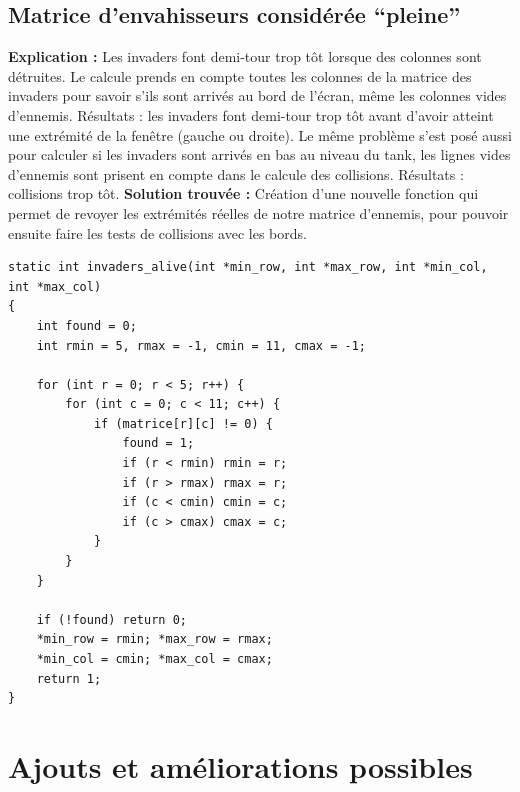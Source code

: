 \documentclass[12pt,a4paper]{report}
\begin{document}
\section{Matrice d'envahisseurs considérée “pleine”}
\textbf{Explication :} Les invaders font demi-tour trop tôt lorsque des colonnes sont détruites. Le calcule prends en compte toutes les colonnes de la matrice des invaders pour savoir s'ils sont arrivés au bord de l'écran, même les colonnes vides d'ennemis. Résultats :  les invaders font demi-tour trop tôt avant d'avoir atteint une extrémité de la fenêtre (gauche ou droite). 
Le même problème s'est posé aussi pour calculer si les invaders sont arrivés en bas au niveau du tank, les lignes vides d'ennemis sont prisent en compte dans le calcule des collisions. Résultats : collisions trop tôt. 
\newline 
\indent \textbf{Solution trouvée :} Création d'une nouvelle fonction qui permet de revoyer les extrémités réelles de notre matrice d'ennemis, pour pouvoir ensuite faire les tests de collisions avec les bords.
\vspace{0.5cm}
\begin{lstlisting}
static int invaders_alive(int *min_row, int *max_row, int *min_col, int *max_col)
{
    int found = 0;
    int rmin = 5, rmax = -1, cmin = 11, cmax = -1;

    for (int r = 0; r < 5; r++) {
        for (int c = 0; c < 11; c++) {
            if (matrice[r][c] != 0) {
                found = 1;
                if (r < rmin) rmin = r;
                if (r > rmax) rmax = r;
                if (c < cmin) cmin = c;
                if (c > cmax) cmax = c;
            }
        }
    }

    if (!found) return 0;
    *min_row = rmin; *max_row = rmax;
    *min_col = cmin; *max_col = cmax;
    return 1;
}
\end{lstlisting}

\chapter{Ajouts et améliorations possibles}
\end{document}
